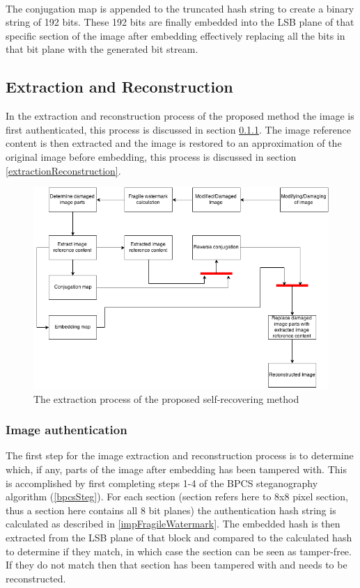 \documentclass[12pt]{article}
\begin{document}
\hspace{0pt} \\
The conjugation map is appended to the truncated hash string to create a binary string of 192 bits.
These 192 bits are finally embedded into the LSB plane of that specific section of the image after embedding effectively replacing all the bits in that bit plane with the generated bit stream.

\subsection{Extraction and Reconstruction}
\label{extractRestore}
In the extraction and reconstruction process of the proposed method the image is first authenticated, this process is discussed in section \ref{extractionAuthentication}. 
The image reference content is then extracted and the image is restored to an approximation of the original image before embedding, this process is discussed in section \ref{extractionReconstruction}.

\begin{figure}[h]
\centerline{%
\includegraphics[scale=0.6]{"ExtractionProcess"}%
} %
\caption{The extraction process of the proposed self-recovering method}
\label{fig:extractionProcess}
\end{figure} 

\subsubsection{Image authentication}
\label{extractionAuthentication}
The first step for the image extraction and reconstruction process is to determine which, if any, parts of the image after embedding has been tampered with.
This is accomplished by first completing steps 1-4 of the BPCS steganography algorithm (\ref{bpcsSteg}).
For each section (section refers here to 8x8 pixel section, thus a section here contains all 8 bit planes) the authentication hash string is calculated as described in \ref{impFragileWatermark}. 
The embedded hash is then extracted from the LSB plane of that block and compared to the calculated hash to determine if they match, in which case the section can be seen as tamper-free.
If they do not match then that section has been tampered with and needs to be reconstructed.
\end{document}
